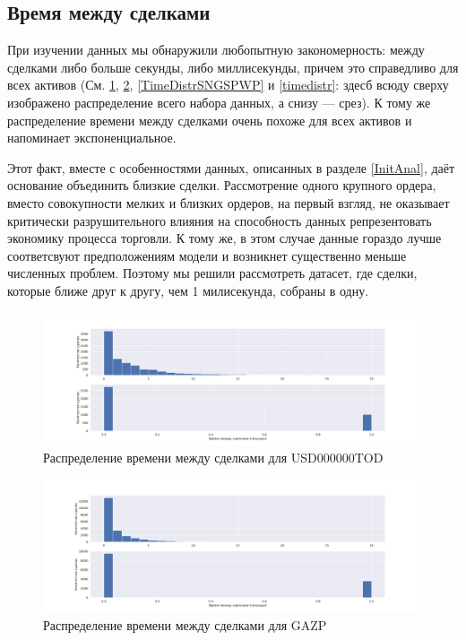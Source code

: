 \subsection{Время между сделками}

При изучении данных мы обнаружили любопытную закономерность: между сделками либо 
больше секунды, либо миллисекунды, причем это справедливо для всех активов
(См. \ref{TimeDistrUSD000000TOD}, \ref{TimeDistrGAZPWP}, \ref{TimeDistrSNGSPWP} и \ref{timedistr}: 
здесб всюду сверху изображено распределение всего набора данных, а снизу --- срез).
К тому же распределение времени между сделками очень похоже для всех активов и напоминает экспоненциальное.
\par 
Этот факт, вместе с особенностями данных, описанных в разделе \ref{InitAnal}, даёт основание 
объединить близкие сделки. Рассмотрение одного крупного ордера, вместо совокупности мелких и близких ордеров,
на первый взгляд, не оказывает критически разрушительного влияния на способность данных репрезентовать экономику процесса торговли. 
К тому же, в этом случае данные гораздо лучше соответсвуют предположениям модели и возникнет существенно меньше численных проблем. 
Поэтому мы решили рассмотреть датасет, где сделки, которые ближе друг к другу, чем 1 милисекунда, собраны в одну.

\begin{figure}
    \includegraphics[scale=0.35]{fig/timedistr/CU/USD000000TOD.pdf}
    \caption{Распределение времени между сделками для USD000000TOD}
    \label{TimeDistrUSD000000TOD}
\end{figure}

\begin{figure}
    \includegraphics[scale=0.35]{fig/timedistr/SE/GAZP.pdf}
    \caption{Распределение времени между сделками для GAZP}
    \label{TimeDistrGAZPWP}
\end{figure}

